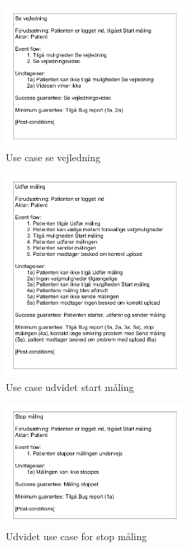 \begin{figure}[H]
\centering
  \includegraphics[width=0.6\textwidth]{Billeder/sevejledning.png}
   \caption{Use case se vejledning} 
   \label{fig:hjerte}
\end{figure}


\begin{figure}[H]
\centering
  \includegraphics[width=0.6\textwidth]{Billeder/startmaling.png}
   \caption{Use case udvidet start måling} 
   \label{fig:hjerte}
\end{figure}


\begin{figure}[H]
\centering
  \includegraphics[width=0.6\textwidth]{Billeder/stopmaling.png}
   \caption{Udvidet use case for stop måling} 
   \label{fig:hjerte}
\end{figure}





